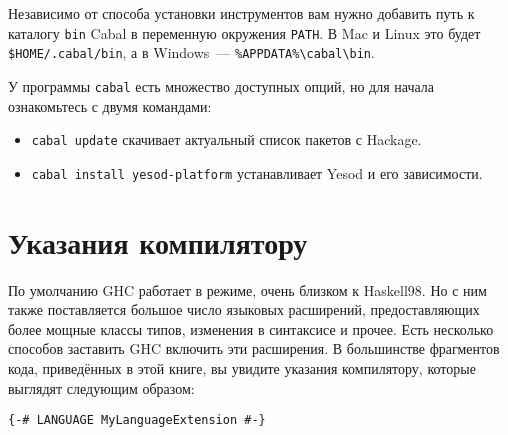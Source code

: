 Независимо от способа установки инструментов вам нужно добавить путь к каталогу \texttt{bin} Cabal в переменную окружения \texttt{PATH}. В Mac и Linux это будет \texttt{\$HOME/.cabal/bin}, а в Windows~--- \texttt{\%APPDATA\%\textbackslash{}cabal\textbackslash{}bin}.

У программы \texttt{cabal} есть множество доступных опций, но для начала ознакомьтесь с двумя командами:

\begin{itemize}
  \item \texttt{cabal update} скачивает актуальный список пакетов с Hackage.
  \item \texttt{cabal install yesod-platform} устанавливает Yesod и его зависимости.
\end{itemize}


\section{Указания компилятору}

По умолчанию GHC работает в режиме, очень близком к Haskell98. Но с ним также поставляется большое число языковых расширений, предоставляющих более мощные классы типов, изменения в синтаксисе и прочее. Есть несколько способов заставить GHC включить эти расширения. В большинстве фрагментов кода, приведённых в этой книге, вы увидите указания компилятору, которые выглядят следующим образом:

\begin{lstlisting}
{-# LANGUAGE MyLanguageExtension #-}
\end{lstlisting}


